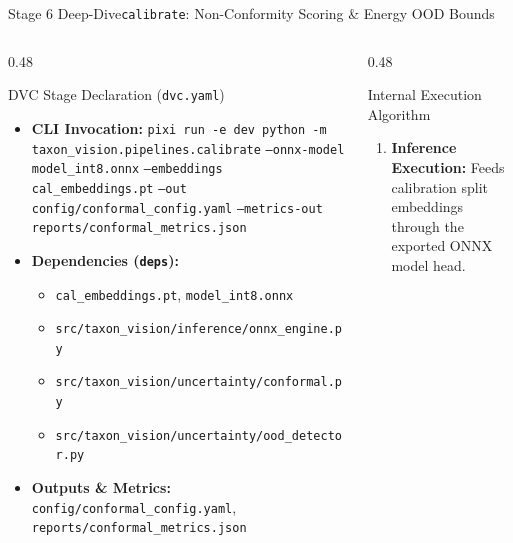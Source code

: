 \begin{frame}{Stage 6 Deep-Dive}{\texttt{calibrate}: Non-Conformity Scoring \& Energy OOD Bounds}
\begin{columns}[T]
\begin{column}{0.48\textwidth}
            \begin{block}{DVC Stage Declaration (\texttt{dvc.yaml})}
                \begin{itemize}\scriptsize
                    \item \textbf{CLI Invocation:}
                        \texttt{pixi run -e dev python -m} \newline
                        \texttt{taxon\_vision.pipelines.calibrate} \newline
                        \texttt{--onnx-model model\_int8.onnx} \newline
                        \texttt{--embeddings cal\_embeddings.pt} \newline
                        \texttt{--out config/conformal\_config.yaml} \newline
                        \texttt{--metrics-out reports/conformal\_metrics.json}
                    \item \textbf{Dependencies (\texttt{deps}):}
                        \begin{itemize}\tiny
                            \item \texttt{cal\_embeddings.pt}, \texttt{model\_int8.onnx}
                            \item \texttt{src/taxon\_vision/inference/onnx\_engine.py}
                            \item \texttt{src/taxon\_vision/uncertainty/conformal.py}
                            \item \texttt{src/taxon\_vision/uncertainty/ood\_detector.py}
                        \end{itemize}
                    \item \textbf{Outputs \& Metrics:}
                        \texttt{config/conformal\_config.yaml}, \newline
                        \texttt{reports/conformal\_metrics.json}
                \end{itemize}
            \end{block}
        \end{column}
        \begin{column}{0.48\textwidth}
            \begin{block}{Internal Execution Algorithm}
                \begin{enumerate}\scriptsize
                    \item \textbf{Inference Execution:} Feeds calibration split embeddings through the exported ONNX model head.

\end{enumerate}
\end{block}
\end{column}
\end{columns}
\end{frame}
